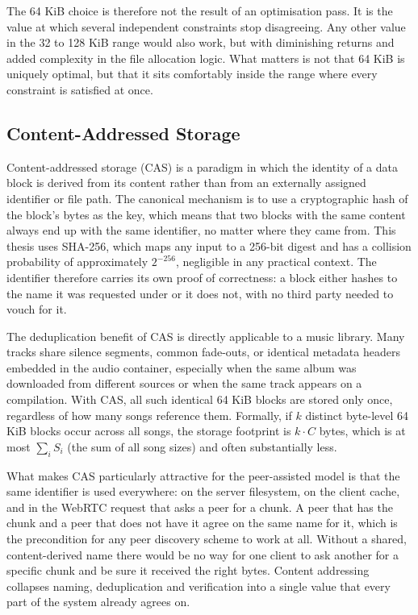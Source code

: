 \par The 64 KiB choice is therefore not the result of an optimisation pass. It is the value at which several independent constraints stop disagreeing. Any other value in the 32 to 128 KiB range would also work, but with diminishing returns and added complexity in the file allocation logic. What matters is not that 64 KiB is uniquely optimal, but that it sits comfortably inside the range where every constraint is satisfied at once.

\subsection{Content-Addressed Storage}
\label{subsec:cas}

\indent \par Content-addressed storage (CAS) is a paradigm in which the identity of a data block is derived from its content rather than from an externally assigned identifier or file path. The canonical mechanism is to use a cryptographic hash of the block's bytes as the key, which means that two blocks with the same content always end up with the same identifier, no matter where they came from. This thesis uses SHA-256, which maps any input to a 256-bit digest and has a collision probability of approximately $2^{-256}$, negligible in any practical context. The identifier therefore carries its own proof of correctness: a block either hashes to the name it was requested under or it does not, with no third party needed to vouch for it.

\par The deduplication benefit of CAS is directly applicable to a music library. Many tracks share silence segments, common fade-outs, or identical metadata headers embedded in the audio container, especially when the same album was downloaded from different sources or when the same track appears on a compilation. With CAS, all such identical 64 KiB blocks are stored only once, regardless of how many songs reference them. Formally, if $k$ distinct byte-level 64 KiB blocks occur across all songs, the storage footprint is $k \cdot C$ bytes, which is at most $\sum_i S_i$ (the sum of all song sizes) and often substantially less.

\par What makes CAS particularly attractive for the peer-assisted model is that the same identifier is used everywhere: on the server filesystem, on the client cache, and in the WebRTC request that asks a peer for a chunk. A peer that has the chunk and a peer that does not have it agree on the same name for it, which is the precondition for any peer discovery scheme to work at all. Without a shared, content-derived name there would be no way for one client to ask another for a specific chunk and be sure it received the right bytes. Content addressing collapses naming, deduplication and verification into a single value that every part of the system already agrees on.

